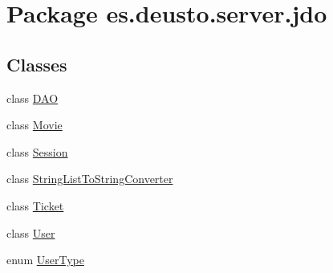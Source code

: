 \hypertarget{namespacees_1_1deusto_1_1server_1_1jdo}{}\section{Package es.\+deusto.\+server.\+jdo}
\label{namespacees_1_1deusto_1_1server_1_1jdo}
\subsection*{Classes}
\begin{DoxyCompactItemize}
\item 
class \mbox{\hyperlink{classes_1_1deusto_1_1server_1_1jdo_1_1_d_a_o}{D\+AO}}
\item 
class \mbox{\hyperlink{classes_1_1deusto_1_1server_1_1jdo_1_1_movie}{Movie}}
\item 
class \mbox{\hyperlink{classes_1_1deusto_1_1server_1_1jdo_1_1_session}{Session}}
\item 
class \mbox{\hyperlink{classes_1_1deusto_1_1server_1_1jdo_1_1_string_list_to_string_converter}{String\+List\+To\+String\+Converter}}
\item 
class \mbox{\hyperlink{classes_1_1deusto_1_1server_1_1jdo_1_1_ticket}{Ticket}}
\item 
class \mbox{\hyperlink{classes_1_1deusto_1_1server_1_1jdo_1_1_user}{User}}
\item 
enum \mbox{\hyperlink{enumes_1_1deusto_1_1server_1_1jdo_1_1_user_type}{User\+Type}}
\end{DoxyCompactItemize}

